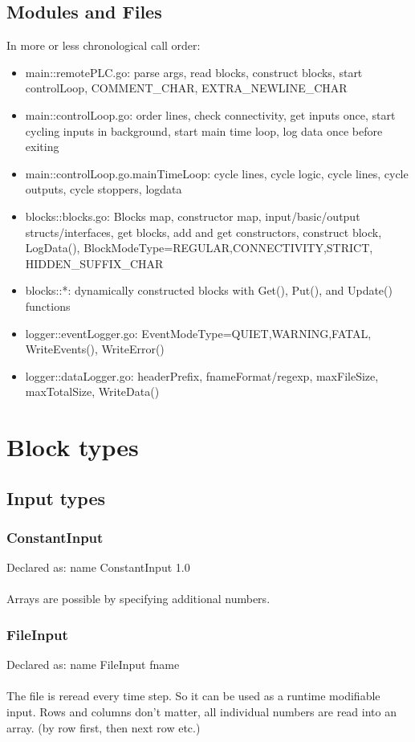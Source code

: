\documentclass[a4paper]{article}
\begin{document}
\subsection{Modules and Files}
In more or less chronological call order:
\begin{itemize}
  \item main::remotePLC.go: parse args, read blocks, construct blocks, start controlLoop, COMMENT\_CHAR, EXTRA\_NEWLINE\_CHAR
  \item main::controlLoop.go: order lines, check connectivity, get inputs once, start cycling inputs in background, start main time loop, log data once before exiting
  \item main::controlLoop.go.mainTimeLoop: cycle lines, cycle logic, cycle lines, cycle outputs, cycle stoppers, logdata
  \item blocks::blocks.go: Blocks map, constructor map, input/basic/output structs/interfaces, get blocks, add and get constructors, construct block, LogData(), BlockModeType=REGULAR,CONNECTIVITY,STRICT, HIDDEN\_SUFFIX\_CHAR
  \item blocks::*: dynamically constructed blocks with Get(), Put(), and Update() functions
  \item logger::eventLogger.go: EventModeType=QUIET,WARNING,FATAL, WriteEvents(), WriteError()
  \item logger::dataLogger.go: headerPrefix, fnameFormat/regexp, maxFileSize, maxTotalSize, WriteData()
\end{itemize}
\section{Block types}
\subsection{Input types}
\subsubsection{ConstantInput}
Declared as: name ConstantInput 1.0\\\\
Arrays are possible by specifying additional numbers.
\subsubsection{FileInput}
Declared as: name FileInput fname\\\\
The file is reread every time step. So it can be used as a runtime modifiable input.
Rows and columns don't matter, all individual numbers are read into an array. (by row first, then next row etc.)
\end{document}
